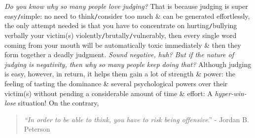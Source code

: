 \documentclass[12pt,oneside]{book}
\begin{document}
{\it Do you know why so many people love judging?} That is because judging is super easy{\tt/}simple: no need to think{\tt/}consider too much \& can be generated effortlessly, the only attempt needed is that you have to concentrate on hurting{\tt/}bullying verbally your victim(s) violently{\tt/}brutally{\tt/}vulnerably, then every single word coming from your mouth will be automatically toxic immediately \& then they form together a deadly judgment. {\it Sound negative, huh? But if the nature of judging is negativity, then why so many people keep doing that?} Although judging is easy, however, in return, it helps them gain a lot of strength \& power: the feeling of tasting the dominance \& several psychological powers over their victim(s) without pending a considerable amount of time \& effort: A {\it hyper-win-lose} situation! On the contrary,
\begin{quotation}
	{\it``In order to be able to think, you have to risk being offensive}.'' - {\sc Jordan B. Peterson}
\end{quotation}
\end{document}
